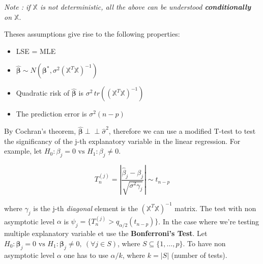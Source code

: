 \documentclass[landscape]{article}
\begin{document}
\begin{multicols}{3}
\emph{Note : if $\mathbb{X}$ is not deterministic, all the above can be understood \textbf{conditionally} on $\mathbb{X}$}.

Theses assumptions give rise to the following properties:

\begin{itemize}[itemsep=0em]
    \item LSE = MLE
    \item $\widehat{\mathbf{\beta}} \sim N(\mathbf{\beta}^*, \sigma^2 (\mathbb{X}^T \mathbb{X})^{-1})$
    \item Quadratic risk of $\widehat{\mathbf{\beta}}$ is $\sigma^2 \, tr((\mathbb{X}^T \mathbb{X})^{-1})$
    \item The prediction error is $\sigma^2 (n - p)$
\end{itemize}

By Cochran's theorem, $\mathbf{\widehat{\beta}} {\perp \!\!\! \perp} \widehat{\sigma}^2$, therefore we can use a modified T-test to test the significancy of the 
j-th explanatory variable in the linear regression. For example, let $H_0: \beta_j = 0 \text{ vs } H_1: \beta_j \ne 0$.

$$ T_{n}^{(j)} = \left| \frac{\widehat{\beta}_j - \beta_j}{\sqrt{\sigma^2 \gamma_j}} \right| \sim t_{n-p}$$

where $\gamma_j$ is the j-th \emph{diagonal} element is the $(\mathbb{X}^T \mathbb{X})^{-1}$ matrix. The test with non asymptotic level $\alpha$ is 
$\psi_{j} = \{ T_n^{(j)} > q_{\alpha/2}(t_{n-p}) \}$. In the case where we're testing multiple explanatory variable et use the \textbf{Bonferroni's Test}.
Let $H_0: \mathbf{\beta}_j = 0 \text{ vs } H_1: \mathbf{\beta}_j \ne 0, \: (\forall j \in S)$, where $S \subseteq \{1, \dots, p\}$. To have non asymptotic level $\alpha$
one has to use $\alpha / k$, where $k = |S|$ (number of tests).

\end{multicols}
\end{document}
